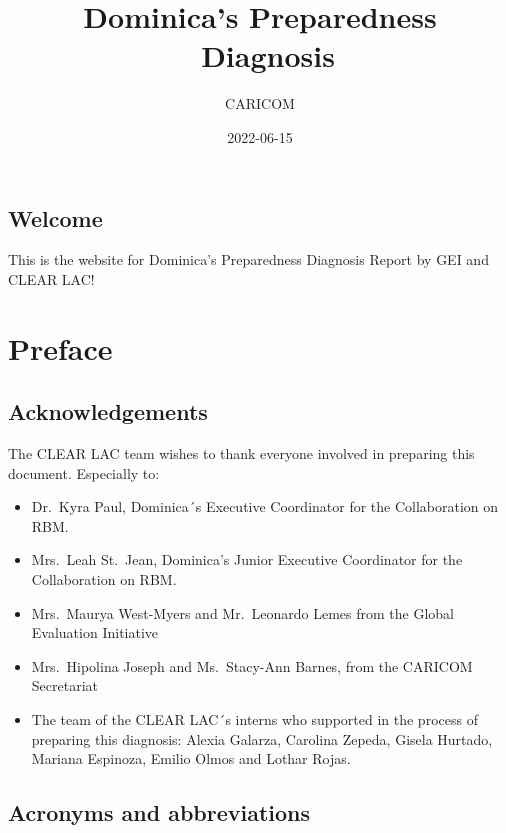 \documentclass[
  10pt,
]{book}
\title{Dominica's Preparedness ~Diagnosis}
\author{CARICOM}
\date{2022-06-15}
\begin{document}
\maketitle

{
\setcounter{tocdepth}{1}
\tableofcontents
}
\hypertarget{welcome}{%
\chapter*{Welcome}\label{welcome}}

This is the website for Dominica's Preparedness Diagnosis Report by GEI and CLEAR LAC!

\hypertarget{part-preface}{%
\part{Preface}\label{part-preface}}

\hypertarget{acknowledgements}{%
\chapter*{Acknowledgements}\label{acknowledgements}}

The CLEAR LAC team wishes to thank everyone involved in preparing this document. Especially to:

\begin{itemize}
\item
  Dr.~Kyra Paul, Dominica´s Executive Coordinator for the Collaboration on RBM.
\item
  Mrs.~Leah St.~Jean, Dominica's Junior Executive Coordinator for the Collaboration on RBM.
\item
  Mrs.~Maurya West-Myers and Mr.~Leonardo Lemes from the Global Evaluation Initiative
\item
  Mrs.~Hipolina Joseph and Ms.~Stacy-Ann Barnes, from the CARICOM Secretariat
\item
  The team of the CLEAR LAC´s interns who supported in the process of preparing this diagnosis: Alexia Galarza, Carolina Zepeda, Gisela Hurtado, Mariana Espinoza, Emilio Olmos and Lothar Rojas.
\end{itemize}

\hypertarget{acronyms-and-abbreviations}{%
\chapter*{Acronyms and abbreviations}\label{acronyms-and-abbreviations}}
\end{document}
